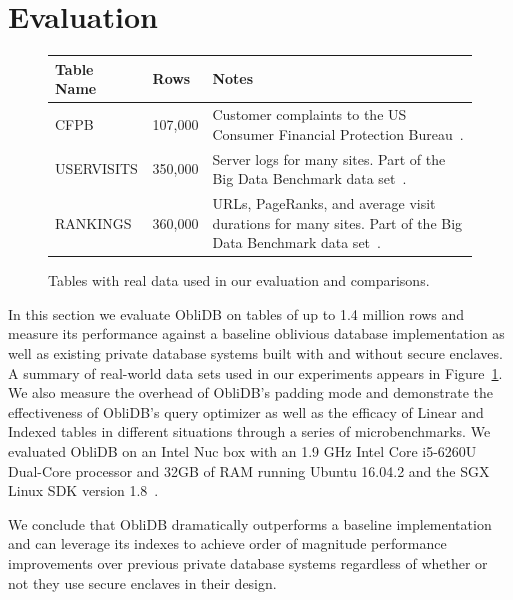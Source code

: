 \documentclass[letterpaper,twocolumn,10pt]{article}
\def\name/{ObliDB}
\begin{document}
\section{Evaluation}\label{eval}
\begin{figure}
\small
\centering
\begin{tabular}{llp{3.1cm}}
\textbf{Table Name} & \textbf{Rows} & \textbf{Notes} \\\hline\rule{0pt}{2ex}
CFPB & 107,000 & Customer complaints to the US Consumer Financial Protection Bureau~\cite{CFPB}.\\
USERVISITS & 350,000 & Server logs for many sites. Part of the Big Data Benchmark data set~\cite{BDB}.\\
RANKINGS & 360,000 & URLs, PageRanks, and average visit durations for many sites. Part of the Big Data Benchmark data set~\cite{BDB}.\\
\end{tabular}
\caption{Tables with real data used in our evaluation and comparisons.}
\label{tabletable}
\end{figure}
In this section we evaluate \name/ on tables of up to 1.4 million rows and measure its performance against a baseline oblivious database implementation as well as existing private database systems built with and without secure enclaves. A summary of real-world data sets used in our experiments appears in Figure~\ref{tabletable}. We also measure the overhead of \name/'s padding mode and  demonstrate the effectiveness of \name/'s query optimizer as well as the efficacy of Linear and Indexed tables in different situations through a series of microbenchmarks. We evaluated \name/ on an Intel Nuc box with an 1.9 GHz Intel Core i5-6260U Dual-Core processor and 32GB of RAM running Ubuntu 16.04.2 and the SGX Linux SDK version 1.8~\cite{SGXRef}. 

We conclude that \name/ dramatically outperforms a baseline implementation and can leverage its indexes to achieve order of magnitude performance improvements over previous private database systems regardless of whether or not they use secure enclaves in their design. 
\end{document}
